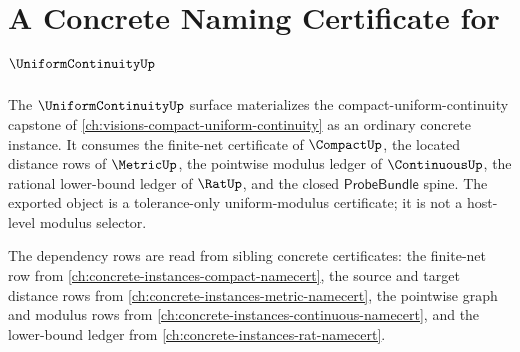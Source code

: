 \chapter{A Concrete Naming Certificate for $\UniformContinuityUp$}
\label{ch:concrete-instances-uniformcontinuity-namecert}

The $\UniformContinuityUp$ surface materializes the compact-uniform-continuity
capstone of \autoref{ch:visions-compact-uniform-continuity} as an ordinary
concrete instance. It consumes the finite-net certificate of $\CompactUp$, the
located distance rows of $\MetricUp$, the pointwise modulus ledger of
$\ContinuousUp$, the rational lower-bound ledger of $\RatUp$, and the closed
$\mathsf{ProbeBundle}$ spine. The exported object is a tolerance-only
uniform-modulus certificate; it is not a host-level modulus selector.

The dependency rows are read from sibling concrete certificates: the finite-net
row from \autoref{ch:concrete-instances-compact-namecert}, the source and
target distance rows from \autoref{ch:concrete-instances-metric-namecert}, the
pointwise graph and modulus rows from
\autoref{ch:concrete-instances-continuous-namecert}, and the lower-bound
ledger from \autoref{ch:concrete-instances-rat-namecert}.

